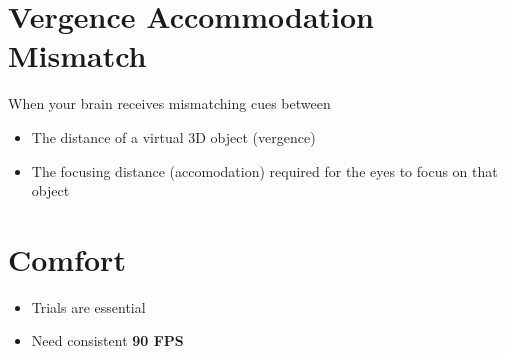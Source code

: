 \section{Vergence Accommodation Mismatch}

  When your brain receives mismatching cues between
  \begin{itemize}
    \item The distance of a virtual 3D object (vergence)
    \item The focusing distance (accomodation) required for the eyes to focus
    on that object
  \end{itemize}

\section{Comfort}

  \begin{itemize}
    \item Trials are essential
    \item Need consistent \textbf{90 FPS}
  \end{itemize}
